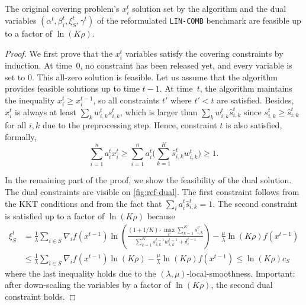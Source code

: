 \begin{lemma} \label{lem:convex-covering-feasibility}
The original covering problem's $x_{i}^{t}$ solution set by the algorithm and the dual variables $(\alpha^{t}, \beta_{i}^{t}, \xi_S^t, \gamma^t)$ of the reformulated \texttt{LIN-COMB} benchmark are feasible up to a factor of $\ln (K\rho)$.
\end{lemma}
%
\begin{proof}
We first prove that the $x_{i}^{t}$ variables satisfy the covering constraints by induction. At time~0, no constraint has been released yet, and every variable is set to 0. This all-zero solution is feasible. Let us assume that the algorithm provides feasible solutions up to time $t-1$. At time~$t$, the algorithm maintains the inequality $x_{i}^{t} \geq x_{i}^{t-1}$, so all constraints $t'$ where $t' < t$ are satisfied. Besides, $x_{i}^{t}$ is always at least
$\sum_{k} w_{i,k}^{t} s_{i,k}^{t}$, which is larger than $\sum_{k} w_{i,k}^{t} \hat{s}_{i,k}^{t}$ since $s_{i,k}^{t} \geq \hat{s}_{i,k}^{t}$
for all $i,k$ due to the preprocessing step. Hence, constraint $t$ is also satisfied, formally,
$$
\sum_{i=1}^{n} a_{i}^{t} x_{i}^{t}  \geq \sum_{i=1}^{n} a_{i}^{t} \biggl( \sum_{k=1}^{K} \hat{s}_{i,k}^{t} w_{i,k}^{t} \biggr) \geq 1.
$$

In the remaining part of the proof, we show the feasibility of the dual solution. The dual constraints are visible on \cref{fig:ref-dual}.
The first constraint follows from the KKT conditions and from the fact that $\sum_{i} a_i^{t} \hat{s}_{i,k}^{t} = 1$.
The second constraint is satisfied up to a factor of $\ln (K\rho)$ because
%
\begin{align*}
\xi_{S}^{t} &= \frac{1}{\lambda} \sum_{i \in S} \nabla_{i} f(x^{t-1}) \ln \left( \frac{(1 + 1/K) \cdot \max_{t'} \sum_{k=1}^{K} s_{i,k}^{t'}}{\sum_{k=1}^{K}  s_{i,k}^{t-1}w_{i,k}^{t-1}  + \delta_{i}^{t-1}} \right) - \frac{\mu}{\lambda} \ln(K\rho) f(x^{t-1})  \\
&\leq \frac{1}{\lambda} \sum_{i \in S} \nabla_{i} f(x^{t-1}) \ln(K\rho)  - \frac{\mu}{\lambda} \ln(K\rho) f(x^{t-1})
\leq  \ln(K\rho) c_S
\end{align*}
%
where the last inequality holds due to the $(\lambda,\mu)$-local-smoothness. Important: after down-scaling the variables by a factor of $\ln (K\rho)$, the second dual constraint holds.


\end{proof}
